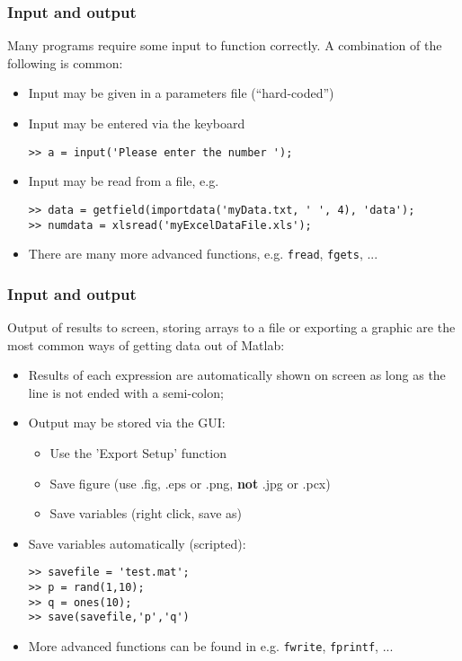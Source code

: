 \documentclass[11pt,table,final,fleqn,xcolor={usenames,dvipsnames},unknownkeysallowed]{beamer}
\begin{document}
\begin{frame}[fragile]
 \frametitle{Input and output}
 Many programs require some input to function correctly. A combination of the following is common:
 \begin{itemize}[<+->]
   \item Input may be given in a parameters file (``hard-coded'')
   \item Input may be entered via the keyboard
   \begin{lstlisting}
>> a = input('Please enter the number ');
   \end{lstlisting}
   \item Input may be read from a file, e.g.
    \begin{lstlisting}
>> data = getfield(importdata('myData.txt, ' ', 4), 'data');
>> numdata = xlsread('myExcelDataFile.xls');
   \end{lstlisting}
   \item There are many more advanced functions, e.g. \lstinline$fread$, \lstinline$fgets$, ...
 \end{itemize}
\end{frame}

\begin{frame}[fragile]
 \frametitle{Input and output}
 Output of results to screen, storing arrays to a file or exporting a graphic are the most common ways of getting data out of Matlab:
 \begin{itemize}[<+->]
   \item Results of each expression are automatically shown on screen as long as the line is not ended with a semi-colon;
   \item Output may be stored via the GUI:
    \begin{itemize}
      \item Use the 'Export Setup' function
      \item Save figure (use .fig, .eps or .png, \textbf{not} .jpg or .pcx)
      \item Save variables (right click, save as)
    \end{itemize}
   \item Save variables automatically (scripted):
    \begin{lstlisting}
>> savefile = 'test.mat';
>> p = rand(1,10);
>> q = ones(10);
>> save(savefile,'p','q')
   \end{lstlisting}
   \item More advanced functions can be found in e.g.  \lstinline$fwrite$, \lstinline$fprintf$, ...
 \end{itemize}
\end{frame}
\end{document}
